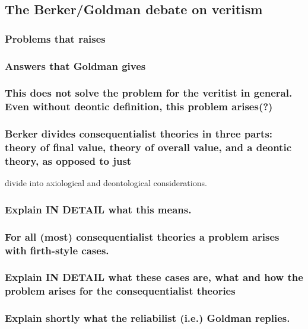 \documentclass[12pt,numbers=noenddot]{scrartcl}
\begin{document}
\subsection{The Berker/Goldman debate on veritism}

\subsubsection{ Problems that \textcite{Berker2013-BERETA-2} raises}
\subsubsection{ Answers that Goldman gives}
\subsubsection{ This does not solve the problem for the veritist in general. Even without deontic definition, this problem arises(?)}
\subsubsection{ Berker divides consequentialist theories in three parts: theory of final value, theory of overall value, and a deontic theory, as opposed to just }divide into axiological and deontological considerations. 
\subsubsection{ Explain IN DETAIL what this means. }
\subsubsection{ For all (most) consequentialist theories a problem arises with firth-style cases. }
\subsubsection{ Explain IN DETAIL what these cases are, what and how the problem arises for the consequentialist theories}
\subsubsection{ Explain shortly what the reliabilist (i.e.) Goldman replies.  }
\end{document}
